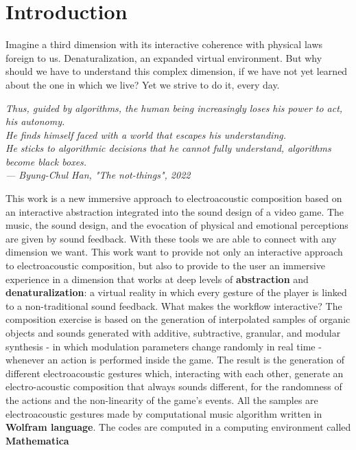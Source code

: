 
\chapter{Introduction}
\label{chp:intro}

Imagine a third dimension with its interactive coherence with physical laws foreign to us. Denaturalization, an expanded virtual environment. But why should we have to understand this complex dimension, if we have not yet learned about the one in which we live?
Yet we strive to do it, every day.

\begin{flushright}
	\itshape
	Thus, guided by algorithms, the human being increasingly loses his power to act, his autonomy. \\
	He finds himself faced with a world that escapes his understanding. \\
	He sticks to algorithmic decisions that he cannot fully understand, algorithms become black boxes.\\
	\medskip
	--- Byung-Chul Han, "The not-things", 2022
\end{flushright}

This work is a new immersive approach to electroacoustic composition based on an interactive abstraction integrated into the sound design of a video game.
The music, the sound design, and the evocation of physical and emotional perceptions are given by sound feedback. With these tools we are able to connect with any dimension we want.
This work want to provide not only an interactive approach to electroacoustic composition, but also to provide to the user an immersive experience in a dimension that works at deep levels of \textbf{abstraction} and \textbf{denaturalization}: a virtual reality in which every gesture of the player is linked to a non-traditional sound feedback.
What makes the workflow interactive? The composition exercise is based on the generation of interpolated samples of organic objects and sounds generated with additive, subtractive, granular, and modular synthesis - in which modulation parameters change randomly in real time - whenever an action is performed inside the game. The result is the generation of different electroacoustic gestures which, interacting with each other, generate an electro-acoustic composition that always sounds different, for the randomness of the actions and the non-linearity of the game's events.
All the samples are electroacoustic gestures made by computational music algorithm written in \textbf{Wolfram language}. The codes are computed in a computing environment called \textbf{Mathematica}

